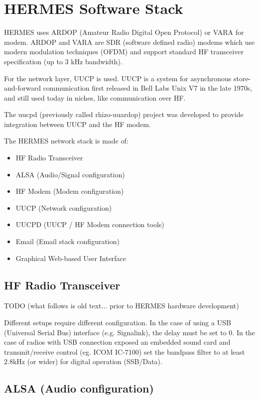 \documentclass[11pt,a4paper]{article}
\begin{document}
\section{HERMES Software Stack}

HERMES uses ARDOP (Amateur Radio Digital Open Protocol) or VARA for modem. ARDOP and VARA are
SDR (software defined radio) modems which use modern modulation techniques (OFDM) and support
standard HF transceiver specification (up to 3 kHz bandwidth).

For the network layer, UUCP is used. UUCP is a system for asynchronous
store-and-forward communication first released in Bell Labs Unix V7 in
the late 1970s, and still used today in niches, like communication over HF.

The uucpd (previously called rhizo-uuardop) project was developed to provide
integration between UUCP and the HF modem.

The HERMES network stack is made of:
\begin{itemize}
\item HF Radio Transceiver
\item ALSA (Audio/Signal configuration)
\item HF Modem (Modem configuration)
\item UUCP (Network configuration)
\item UUCPD (UUCP / HF Modem connection tools)
\item Email (Email stack configuration)
\item Graphical Web-based User Interface
\end{itemize}

\subsection{HF Radio Transceiver}

TODO (what follows is old text... prior to HERMES hardware development)

Different setups require different configuration. In the case of using a USB
(Universal Serial Bus) interface (e.g. Signalink), the delay must be set to
0. In the case of radios with USB connection exposed an embedded sound
card and transmit/receive control (eg. ICOM IC-7100) set the bandpass
filter to at least 2.8kHz (or wider) for digital operation (SSB/Data).

\subsection{ALSA (Audio configuration)}
\end{document}
